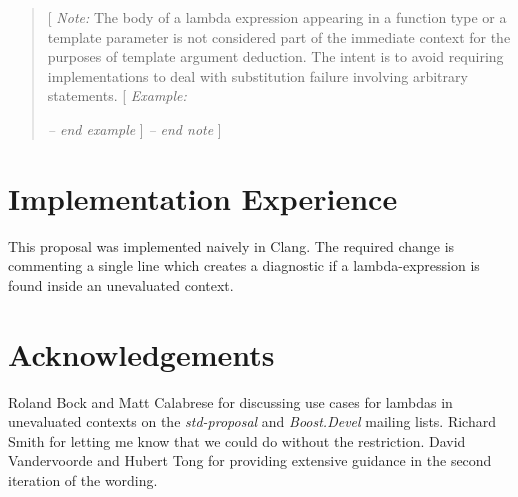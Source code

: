 \documentclass[11pt]{article}
\begin{document}
\begin{enumerate}
  \begin{quote}
    [ \textit{Note:} The body of a lambda expression appearing in a function
    type or a template parameter is not considered part of the immediate
    context for the purposes of template argument deduction. The intent is
    to avoid requiring implementations to deal with substitution failure
    involving arbitrary statements. [ \textit{Example:}
    \textit{-- end example} ]
    \textit{-- end note} ]
  \end{quote}

\end{enumerate}


\section{Implementation Experience}
This proposal was implemented naively in Clang. The required change is commenting
a single line which creates a diagnostic if a lambda-expression is found inside an
unevaluated context.


\section{Acknowledgements}
Roland Bock and Matt Calabrese for discussing use cases for lambdas in unevaluated
contexts on the \textit{std-proposal} and \textit{Boost.Devel} mailing lists.
Richard Smith for letting me know that we could do without the restriction.
David Vandervoorde and Hubert Tong for providing extensive guidance in the
second iteration of the wording.
\end{document}
